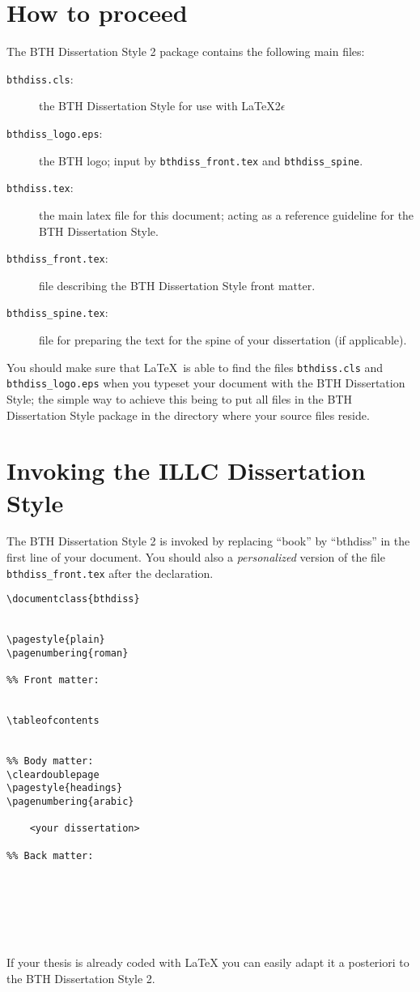 \section{How to proceed}
The BTH Dissertation Style 2 package contains the following main files:

\begin{description} 
	\item[{\tt bthdiss.cls}:] the BTH Dissertation Style for use with \LaTeX 2$\epsilon$
	\item[{\tt bthdiss\_logo.eps}:] the BTH logo; input by {\tt bthdiss\_front.tex} and {\tt bthdiss\_spine}.
	\item[{\tt bthdiss.tex}:] the main latex file for this document; acting as a reference guideline for the BTH Dissertation Style.
	\item[{\tt bthdiss\_front.tex}:] file describing the BTH Dissertation Style front matter.
	\item[{\tt bthdiss\_spine.tex}:] file for preparing the text for the spine of your dissertation (if applicable).
\end{description}

You should make sure that \LaTeX\ is able to find the files {\tt bthdiss.cls} and {\tt bthdiss\_logo.eps} when you typeset your document with the BTH Dissertation Style; the simple way to achieve this being to put all files in the BTH Dissertation Style package in the directory where your source files reside.

\section{Invoking the ILLC Dissertation Style}
The BTH Dissertation Style 2 is invoked by replacing ``book'' by ``bthdiss'' in the first line of your document. You should also \verb|| 
a {\em personalized\/} version of the file {\tt bthdiss\_front.tex} after the \verb|| declaration.

\begin{verbatim}
\documentclass{bthdiss}


\pagestyle{plain}
\pagenumbering{roman}

%% Front matter:


\tableofcontents


%% Body matter:
\cleardoublepage
\pagestyle{headings}
\pagenumbering{arabic}
  
    <your dissertation>

%% Back matter:







\end{verbatim}
%
%
If your thesis is already coded with \LaTeX{} you can easily
adapt it a posteriori to the BTH Dissertation Style 2.

